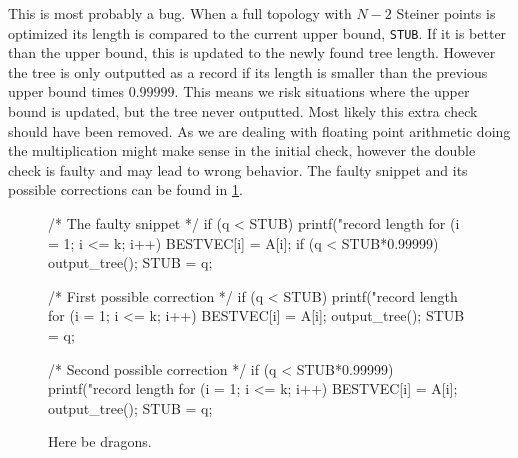 This is most probably a bug.  When a full topology with $N-2$ Steiner points is
optimized its length is compared to the current upper bound, \texttt{STUB}. If
it is better than the upper bound, this is updated to the newly found tree
length.  However the tree is only outputted as a record if its length is smaller
than the previous upper bound times $0.99999$.  This means we risk situations
where the upper bound is updated, but the tree never outputted.  Most likely
this extra check should have been removed.  As we are dealing with floating
point arithmetic doing the multiplication might make sense in the initial check,
however the double check is faulty and may lead to wrong behavior. The faulty
snippet and its possible corrections can be found in \cref{fig:if-clause-snippet}.

\begin{figure}[htbp]
  \begin{c-code}
    /* The faulty snippet */
    if (q < STUB) {
      printf("\nnew record length %
      for (i = 1; i <= k; i++) BESTVEC[i] = A[i];
      if (q < STUB*0.99999) output_tree();
      STUB = q;
    }

    /* First possible correction */
    if (q < STUB) {
      printf("\nnew record length %
      for (i = 1; i <= k; i++) BESTVEC[i] = A[i];
      output_tree();
      STUB = q;
    }

    /* Second possible correction */
    if (q < STUB*0.99999) {
      printf("\nnew record length %
      for (i = 1; i <= k; i++) BESTVEC[i] = A[i];
      output_tree();
      STUB = q;
    }
  \end{c-code}
  \caption[Here be dragons]{Here be dragons.\label{fig:if-clause-snippet}}
\end{figure}

\chapterbreak{}


